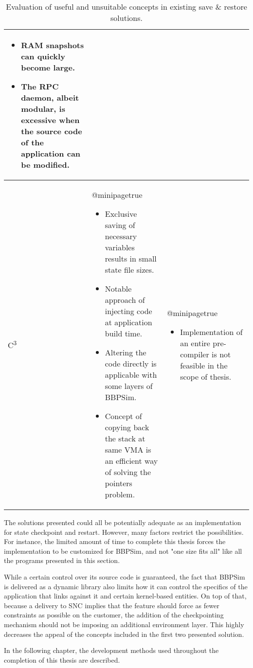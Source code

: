 {\begin{table}[htbp]
\begin{tabularx}{\linewidth}{l X X}
\begin{itemize}[leftmargin=*]
			\item RAM snapshots can quickly become large.
			\item The RPC daemon, albeit modular, is excessive when the source code of the application can be modified.
		\end{itemize}\\
		\midrule
		C\textsuperscript{3} & 
		\csname @minipagetrue\endcsname 
		\begin{itemize}[leftmargin=*]
			\item Exclusive saving of necessary variables results in small state file sizes.
			\item Notable approach of injecting code at application build time.
			\item Altering the code directly is applicable with some layers of BBPSim.
			\item Concept of copying back the stack at same \gls{VMA} is an efficient way of solving the pointers problem.
		\end{itemize} & 
		\csname @minipagetrue\endcsname 
		\begin{itemize}[leftmargin=*]
			\item Implementation of an entire pre-compiler is not feasible in the scope of thesis.
		\end{itemize}\\
		\bottomrule
	\end{tabularx}
	\caption{Evaluation of useful and unsuitable concepts in existing save \& restore solutions.}
	\label{tab:solutions-summary}
\end{table}

The solutions presented could all be potentially adequate as an implementation for state checkpoint and restart. However, many factors restrict the possibilities. For instance, the limited amount of time to complete this thesis forces the implementation to be customized for \gls{BBPSim}, and not "one size fits all" like all the programs presented in this section. 

While a certain control over its source code is guaranteed, the fact that BBPSim is delivered as a dynamic library also limits how it can control the specifics of the application that links against it and certain kernel-based entities. On top of that, because a delivery to \gls{SNC} implies that the feature should force as fewer constraints as possible on the customer, the addition of the checkpointing mechanism should not be imposing an additional environment layer. This highly decreases the appeal of the concepts included in the first two presented solution.

In the following chapter, the development methods used throughout the completion of this thesis are described. 

}